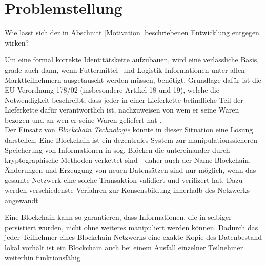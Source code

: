 \section{Problemstellung} \label{Problemstellung}

Wie lässt sich der in Abschnitt \ref{Motivation} beschriebenen Entwicklung entgegen wirken?

Um eine formal korrekte Identitätskette aufzubauen, wird eine verlässliche Basis, grade auch dann, wenn Futtermittel- und Logistik-Informationen unter allen Marktteilnehmern ausgetauscht werden müssen, benötigt. Grundlage dafür ist die EU-Verordnung 178/02 (insbesondere Artikel 18 und 19), welche die Notwendigkeit beschreibt, dass jeder in einer Lieferkette befindliche Teil der Lieferkette dafür verantwortlich ist, nachzuweisen von wem er seine Waren bezogen und an wen er seine Waren geliefert hat \citep{EPER2002}.\\

Der Einsatz von \textit{Blockchain Technologie} könnte in dieser Situation eine Lösung darstellen. Eine Blockchain ist ein dezentrales System zur manipulationssicheren Speicherung von Informationen in sog. Blöcken die untereinander durch kryptographische Methoden verkettet sind - daher auch der Name Blockchain. Änderungen und Erzeugung von neuen Datensätzen sind nur möglich, wenn das gesamte Netzwerk eine solche Transaktion validiert und verifizert hat. Dazu werden verschiedenste Verfahren zur Konsensbildung innerhalb des Netzwerks angewandt \citep[siehe auch][]{Nakamoto2009, Buterin2014, Cardano2017, carVertical}.

Eine Blockchain kann so garantieren, dass Informationen, die in selbiger persistiert wurden, nicht ohne weiteres manipuliert werden können. Dadurch das jeder Teilnehmer eines Blockchain Netzwerks eine exakte Kopie des Datenbestand lokal vorhält ist ein Blockchain auch bei einem Ausfall einzelner Teilnehmer weiterhin funktionsfähig \citep{Drescher2017, Tribis2018}.


